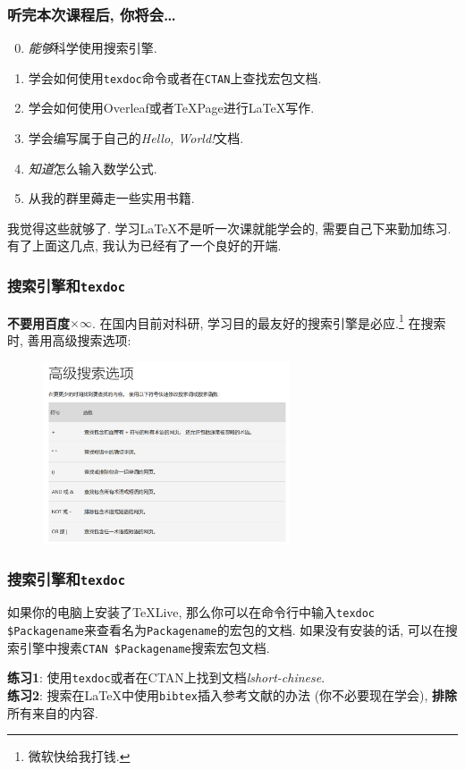 \documentclass{beamer}
\begin{document}
\begin{frame}
    \frametitle{听完本次课程后, 你将会\dots}
    \begin{enumerate}[(1)]
        \setcounter{enumi}{-1}
        \item \emph{能够}科学使用搜索引擎.
        \item 学会如何使用\Verb|texdoc|命令或者在\Verb|CTAN|上查找宏包文档.
        \item 学会如何使用Overleaf或者\TeX{}Page进行\LaTeX{}写作.
        \item 学会编写属于自己的\emph{Hello, World!}文档.
        \item \emph{知道}怎么输入数学公式.
        \item 从我的群里薅走一些实用书籍.
    \end{enumerate}\pause
    我觉得这些就够了.
    学习\LaTeX{}不是听一次课就能学会的, 需要自己下来勤加练习.
    有了上面这几点, 我认为已经有了一个良好的开端.
\end{frame}

\begin{frame}
    \frametitle{搜索引擎和\Verb|texdoc|}
    \textbf{不要用百度}$\times\infty$.
    在国内目前对科研, 学习目的最友好的搜索引擎是必应.\footnote{微软快给我打钱.}
    在搜索时, 善用高级搜索选项:
    \begin{figure}[h]
        \centering
        \includegraphics[width=0.65\textwidth]{figure/bing-search.png}
    \end{figure}
\end{frame}

\begin{frame}[fragile]
    \frametitle{搜索引擎和\Verb|texdoc|}
    如果你的电脑上安装了\TeX{}Live, 那么你可以在命令行中输入\Verb|texdoc $Packagename|来查看名为\Verb|Packagename|的宏包的文档.
    如果没有安装的话, 可以在搜索引擎中搜素\Verb|CTAN $Packagename|搜索宏包文档.\pause

    \textbf{练习1}: 使用\Verb|texdoc|或者在CTAN上找到文档\emph{lshort-chinese}.\\
    \textbf{练习2}: 搜索在\LaTeX{}中使用\Verb|bibtex|插入参考文献的办法 (你不必要现在学会), \textbf{排除}所有来自的内容.
\end{frame}
\end{document}
